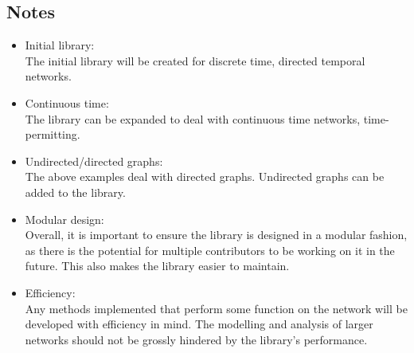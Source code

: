 \begin{design}
\subsection{Notes}
\begin{itemize}
  \item Initial library:\\
  The initial library will be created for discrete time, directed temporal networks.
  \item Continuous time:\\
  The library can be expanded to deal with continuous time networks, time-permitting.
  \item Undirected/directed graphs:\\
  The above examples deal with directed graphs. Undirected graphs can be added to the library.
  \item Modular design:\\
  Overall, it is important to ensure the library is designed in a modular fashion, as there is the potential for multiple contributors to be working on it in the future. This also makes the library easier to maintain.
  \item Efficiency:\\
  Any methods implemented that perform some function on the network will be developed with efficiency in mind. The modelling and analysis of larger networks should not be grossly hindered by the library's performance.
\end{itemize}
\end{design}
\clearpage